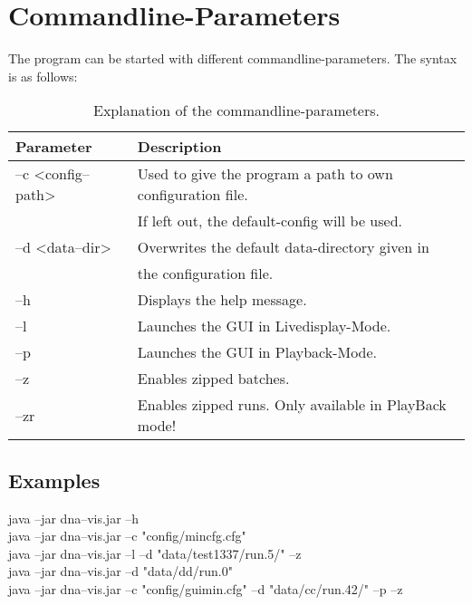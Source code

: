 \chapter{Commandline-Parameters}
The program can be started with different commandline-parameters. The syntax is as follows:\
\


\begin{table}[h]
\centering
\begin{tabular}[h]{|l|l|}\hline
	\textbf{Parameter} & \textbf{Description}\\
	\hline
	--c \textless config--path\textgreater & Used to give the program a path to  own configuration file.\\
	& If left out, the default-config will be used. \\
	\hline
	--d \textless data--dir\textgreater & Overwrites the default data-directory given in \\
	& the configuration file. \\
	\hline
	--h & Displays the help message. \\
	\hline
	--l & Launches the GUI in Livedisplay-Mode.\\
	\hline
	--p & Launches the GUI in Playback-Mode.\\
	\hline
	--z & Enables zipped batches.\\
	\hline
	--zr & Enables zipped runs. Only available in PlayBack mode!\\
	\hline
\end{tabular}
\caption{Explanation of the commandline-parameters.}
\label{tab:cmdline1}
\end{table}

\section{Examples}
\begin{flushleft}
java --jar dna--vis.jar --h\\
java --jar dna--vis.jar --c "config/min\textunderscore cfg.cfg"\\
java --jar dna--vis.jar --l --d "data/test1337/run.5/" --z\\
java --jar dna--vis.jar --d "data/dd/run.0"\\
java --jar dna--vis.jar --c "config/gui\textunderscore min.cfg" --d "data/cc/run.42/" --p --z\\
\end{flushleft}